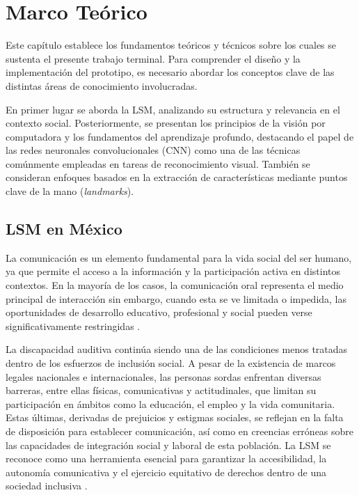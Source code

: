 	\section{Marco Teórico}
	
	Este capítulo establece los fundamentos teóricos y técnicos sobre los cuales se sustenta el presente trabajo terminal. Para comprender el diseño y la implementación del prototipo, es necesario abordar los conceptos clave de las distintas áreas de conocimiento involucradas.
	
	En primer lugar se aborda la LSM, analizando su estructura y relevancia en el contexto social. Posteriormente, se presentan los principios de la visión por computadora y los fundamentos del aprendizaje profundo, destacando el papel de las redes neuronales convolucionales (CNN) como una de las técnicas comúnmente empleadas en tareas de reconocimiento visual. También se consideran enfoques basados en la extracción de características mediante puntos clave de la mano (\textit{landmarks}).
	
	\subsection{LSM en México}
	
	La comunicación es un elemento fundamental para la vida social del ser humano, ya que permite el acceso a la información y la participación activa en distintos contextos. En la mayoría de los casos, la comunicación oral representa el medio principal de interacción sin embargo, cuando esta se ve limitada o impedida, las oportunidades de desarrollo educativo, profesional y social pueden verse significativamente restringidas \cite{sep2023lsm}.
	
	La discapacidad auditiva continúa siendo una de las condiciones menos tratadas dentro de los esfuerzos de inclusión social. A pesar de la existencia de marcos legales nacionales e internacionales, las personas sordas enfrentan diversas barreras, entre ellas físicas, comunicativas y actitudinales, que limitan su participación en ámbitos como la educación, el empleo y la vida comunitaria. Estas últimas, derivadas de prejuicios y estigmas sociales, se reflejan en la falta de disposición para establecer comunicación, así como en creencias erróneas sobre las capacidades de integración social y laboral de esta población. La LSM se reconoce como una herramienta esencial para garantizar la accesibilidad, la autonomía comunicativa y el ejercicio equitativo de derechos dentro de una sociedad inclusiva \cite{sanchez2022discapacidad}.
	
